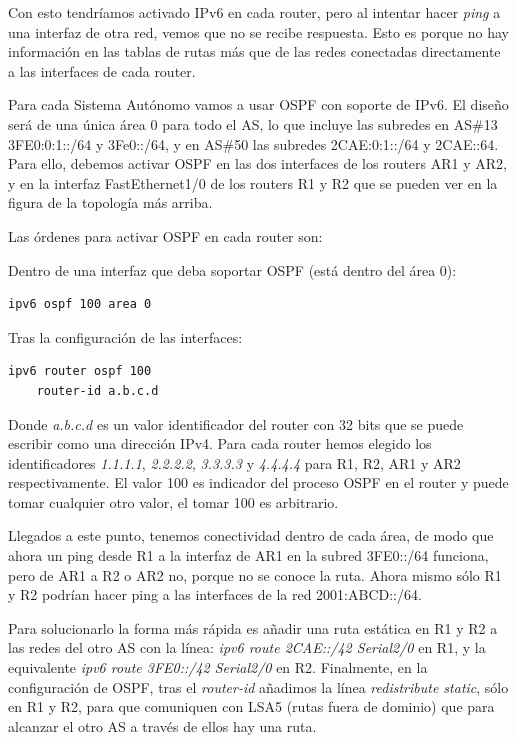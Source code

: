 \documentclass{article}
\begin{document}
Con esto tendríamos activado IPv6 en cada router, pero al intentar hacer \textit{ping} a una interfaz de otra red, vemos que no se recibe respuesta. Esto es porque no hay información en las tablas de rutas más que de las redes conectadas directamente a las interfaces de cada router.

Para cada Sistema Autónomo vamos a usar OSPF con soporte de IPv6. El diseño será de una única área 0 para todo el AS, lo que incluye las subredes en AS\#13 3FE0:0:1::/64 y 3Fe0::/64, y en AS\#50 las subredes 2CAE:0:1::/64 y 2CAE::64. Para ello, debemos activar OSPF en las dos interfaces de los routers AR1 y AR2, y en la interfaz FastEthernet1/0 de los routers R1 y R2 que se pueden ver en la figura de la topología más arriba.                                                                         

Las órdenes para activar OSPF en cada router son:

Dentro de una interfaz que deba soportar OSPF (está dentro del área 0):
\begin{lstlisting}
ipv6 ospf 100 area 0
\end{lstlisting}

Tras la configuración de las interfaces:
\begin{lstlisting}
ipv6 router ospf 100
	router-id a.b.c.d
\end{lstlisting}

Donde \textit{a.b.c.d} es un valor identificador del router con 32 bits que se puede escribir como una dirección IPv4. Para cada router hemos elegido los identificadores \textit{1.1.1.1}, \textit{2.2.2.2}, \textit{3.3.3.3} y \textit{4.4.4.4} para R1, R2, AR1 y AR2 respectivamente. El valor 100 es indicador del proceso OSPF en el router y puede tomar cualquier otro valor, el tomar 100 es arbitrario.

Llegados a este punto, tenemos conectividad dentro de cada área, de modo que ahora un ping desde R1 a la interfaz de AR1 en la subred 3FE0::/64 funciona, pero de AR1 a R2 o AR2 no, porque no se conoce la ruta. Ahora mismo sólo R1 y R2 podrían hacer ping a las interfaces de la red 2001:ABCD::/64.

Para solucionarlo la forma más rápida es añadir una ruta estática en R1 y R2 a las redes del otro AS con la línea: \textit{ipv6 route 2CAE::/42 Serial2/0} en R1, y la equivalente \textit{ipv6 route 3FE0::/42 Serial2/0} en R2. Finalmente, en la configuración de OSPF, tras el \textit{router-id} añadimos la línea \textit{redistribute static}, sólo en R1 y R2, para que comuniquen con LSA5 (rutas fuera de dominio) que para alcanzar el otro AS a través de ellos hay una ruta.
\\
\end{document}
